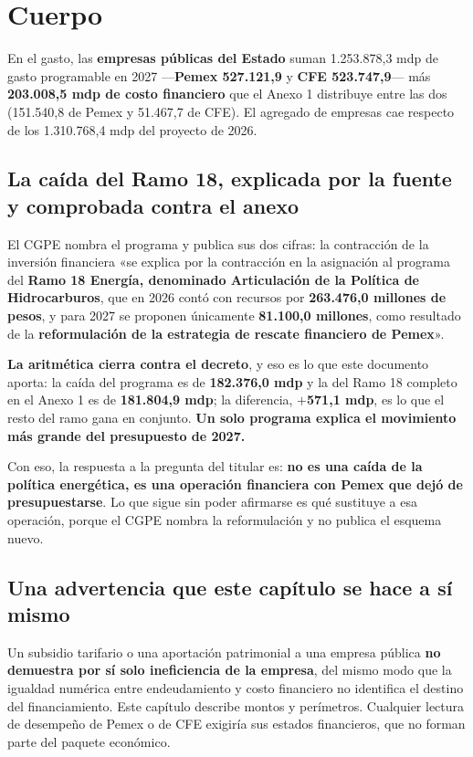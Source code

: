 \section{Cuerpo}

En el gasto, las \textbf{empresas públicas del Estado} suman 1.253.878,3 mdp de gasto
programable en 2027 ---\textbf{Pemex 527.121,9} y \textbf{CFE 523.747,9}--- más
\textbf{203.008,5 mdp de costo financiero} que el Anexo 1 distribuye entre las dos
(151.540,8 de Pemex y 51.467,7 de CFE). El agregado de empresas cae respecto de los
1.310.768,4 mdp del proyecto de 2026.

\subsection*{La caída del Ramo 18, explicada por la fuente y comprobada contra el anexo}

El CGPE nombra el programa y publica sus dos cifras: la contracción de la inversión
financiera «se explica por la contracción en la asignación al programa del \textbf{Ramo 18
Energía, denominado Articulación de la Política de Hidrocarburos}, que en 2026 contó con
recursos por \textbf{263.476,0 millones de pesos}, y para 2027 se proponen únicamente
\textbf{81.100,0 millones}, como resultado de la \textbf{reformulación de la estrategia de
rescate financiero de Pemex}».

\textbf{La aritmética cierra contra el decreto}, y eso es lo que este documento aporta: la
caída del programa es de \textbf{182.376,0 mdp} y la del Ramo 18 completo en el Anexo 1 es
de \textbf{181.804,9 mdp}; la diferencia, \textbf{$+$571,1 mdp}, es lo que el resto del ramo
gana en conjunto. \textbf{Un solo programa explica el movimiento más grande del
presupuesto de 2027.}

Con eso, la respuesta a la pregunta del titular es: \textbf{no es una caída de la política
energética, es una operación financiera con Pemex que dejó de presupuestarse}. Lo que sigue
sin poder afirmarse es qué sustituye a esa operación, porque el CGPE nombra la reformulación
y no publica el esquema nuevo.

\subsection*{Una advertencia que este capítulo se hace a sí mismo}

Un subsidio tarifario o una aportación patrimonial a una empresa pública \textbf{no
demuestra por sí solo ineficiencia de la empresa}, del mismo modo que la igualdad numérica
entre endeudamiento y costo financiero no identifica el destino del financiamiento. Este
capítulo describe montos y perímetros. Cualquier lectura de desempeño de Pemex o de CFE
exigiría sus estados financieros, que no forman parte del paquete económico.

